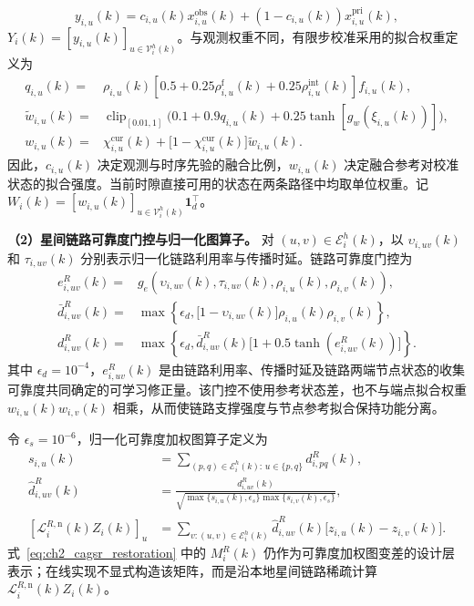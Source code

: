 \begin{equation}
y_{i,u}(k)
=
c_{i,u}(k)x_{i,u}^{\mathrm{obs}}(k)
+
\left(1-c_{i,u}(k)\right)
x_{i,u}^{\mathrm{pri}}(k),
\label{eq:ch2_cagsr_reference}
\end{equation}
$Y_i(k)=[y_{i,u}(k)]_{u\in\mathcal V_i^h(k)}$。与观测权重不同，有限步校准采用的拟合权重定义为
\begin{equation}
\begin{aligned}
q_{i,u}(k)
={}&\rho_{i,u}(k)\left[0.5+0.25\rho_{i,u}^{\mathrm f}(k)
+0.25\rho_{i,u}^{\mathrm{int}}(k)\right]f_{i,u}(k),\\
\widetilde w_{i,u}(k)
={}&\operatorname{clip}_{[0.01,1]}\!\Big(0.1+0.9q_{i,u}(k)
+0.25\tanh\!\left[g_w(\xi_{i,u}(k))\right]\Big),\\
w_{i,u}(k)
={}&\chi_{i,u}^{\mathrm{cur}}(k)
+\big[1-\chi_{i,u}^{\mathrm{cur}}(k)\big]\widetilde w_{i,u}(k).
\end{aligned}
\label{eq:ch2_cagsr_fidelity}
\end{equation}
因此，$c_{i,u}(k)$ 决定观测与时序先验的融合比例，$w_{i,u}(k)$ 决定融合参考对校准状态的拟合强度。当前时隙直接可用的状态在两条路径中均取单位权重。记 $W_i(k)=[w_{i,u}(k)]_{u\in\mathcal V_i^h(k)}\mathbf 1_d^\top$。

\textbf{（2）星间链路可靠度门控与归一化图算子。} 对 $(u,v)\in\mathcal E_i^h(k)$，以 $\upsilon_{i,uv}(k)$ 和 $\tau_{i,uv}(k)$ 分别表示归一化链路利用率与传播时延。链路可靠度门控为
\begin{equation}
\begin{aligned}
e_{i,uv}^{R}(k)
={}&g_e\!\left(\upsilon_{i,uv}(k),\tau_{i,uv}(k),
\rho_{i,u}(k),\rho_{i,v}(k)\right),\\
\bar d_{i,uv}^{R}(k)
={}&\max\!\left\{\epsilon_d,
\big[1-\upsilon_{i,uv}(k)\big]\rho_{i,u}(k)\rho_{i,v}(k)\right\},\\
d_{i,uv}^{R}(k)
={}&\max\!\left\{\epsilon_d,
\bar d_{i,uv}^{R}(k)\big[1+0.5\tanh(e_{i,uv}^{R}(k))\big]\right\}.
\end{aligned}
\label{eq:ch2_cagsr_edgecoeff}
\end{equation}
其中 $\epsilon_d=10^{-4}$，$e_{i,uv}^{R}(k)$ 是由链路利用率、传播时延及链路两端节点状态的收集可靠度共同确定的可学习修正量。该门控不使用参考状态差，也不与端点拟合权重 $w_{i,u}(k)w_{i,v}(k)$ 相乘，从而使链路支撑强度与节点参考拟合保持功能分离。

令 $\epsilon_s=10^{-6}$，归一化可靠度加权图算子定义为
\begin{equation}
\begin{aligned}
s_{i,u}(k)&=\sum_{(p,q)\in\mathcal E_i^h(k):\,u\in\{p,q\}}d_{i,pq}^{R}(k),\\
\widehat d_{i,uv}^{R}(k)
&=\frac{d_{i,uv}^{R}(k)}
{\sqrt{\max\{s_{i,u}(k),\epsilon_s\}\max\{s_{i,v}(k),\epsilon_s\}}},\\
\left[\mathcal L_i^{R,\mathrm n}(k)Z_i(k)\right]_u
&=\sum_{v:(u,v)\in\mathcal E_i^h(k)}
\widehat d_{i,uv}^{R}(k)\big[z_{i,u}(k)-z_{i,v}(k)\big].
\end{aligned}
\label{eq:ch2_cagsr_graphop}
\end{equation}
式~\eqref{eq:ch2_cagsr_restoration} 中的 $M_i^R(k)$ 仍作为可靠度加权图变差的设计层表示；在线实现不显式构造该矩阵，而是沿本地星间链路稀疏计算 $\mathcal L_i^{R,\mathrm n}(k)Z_i(k)$。

